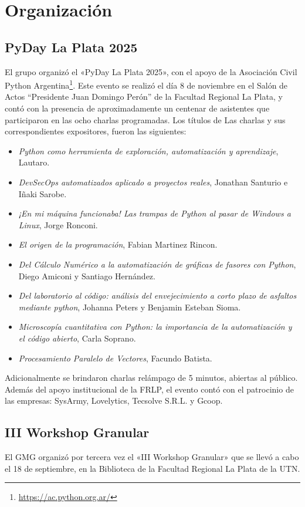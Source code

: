 \documentclass[a4paper,11pt,twoside,final,titlepage,onecolumn,openright]{report}
\begin{document}
\section{Organización}
\subsection{PyDay La Plata 2025}

El grupo organizó el «PyDay La Plata 2025», con el apoyo de la Asociación Civil Python Argentina\footnote{\url{https://ac.python.org.ar/}}. Este evento se realizó el día 8 de noviembre en el Salón de Actos ``Presidente Juan Domingo Perón'' de la Facultad Regional La Plata, y contó con la presencia de aproximadamente un centenar de asistentes que participaron en las ocho charlas programadas. Los títulos de Las charlas y sus correspondientes expositores, fueron las siguientes:
\begin{itemize}
	\item \textit{Python como herramienta de exploración, automatización y aprendizaje}, Lautaro.
	\item \textit{DevSecOps automatizados aplicado a proyectos reales}, Jonathan Santurio e Iñaki Sarobe.
	\item \textit{¡En mi máquina funcionaba! Las trampas de Python al pasar de Windows a Linux}, Jorge Ronconi.
	\item \textit{El origen de la programación}, Fabian Martinez Rincon.
	\item \textit{Del Cálculo Numérico a la automatización de gráficas de fasores con Python}, Diego Amiconi y Santiago Hernández.
	\item \textit{Del laboratorio al código: análisis del envejecimiento a corto plazo de asfaltos mediante python}, Johanna Peters y Benjamin Esteban Sioma.
	\item \textit{Microscopía cuantitativa con Python: la importancia de la automatización y el código abierto}, Carla Soprano.
	\item \textit{Procesamiento Paralelo de Vectores}, Facundo Batista.
\end{itemize}

Adicionalmente se brindaron charlas relámpago de 5 minutos, abiertas al público. Además del apoyo institucional de la FRLP, el evento contó con el patrocinio de las empresas: SysArmy, Lovelytics, Tecsolve S.R.L. y Gcoop.

\subsection{III Workshop Granular}
El GMG organizó por tercera vez el «III Workshop Granular» que se llevó a cabo el 18 de septiembre, en la Biblioteca de la Facultad Regional La Plata de la UTN.
\end{document}
